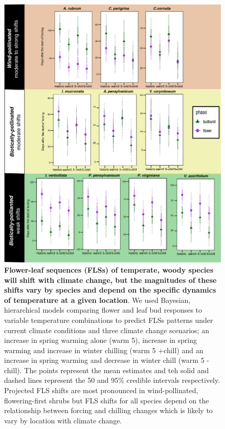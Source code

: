 \documentclass[11pt]{article}
\begin{document}
\pagebreak
\begin{figure}[h!]
    \centering
 \includegraphics[width=\textwidth]{..//Plots/Flobuds_manuscript_figs/climpredictions.jpg}
    \caption{\textbf{Flower-leaf sequences (FLSs) of temperate, woody species will shift with climate change, but the magnitudes of these shifts vary by species and depend on the specific dynamics of temperature at a given location}. We used Bayesian, hierarchical models comparing flower and leaf bud responses to variable temperature combinations to predict FLSs patterns under current climate conditions and three climate change scenarios;  an increase in spring warming alone (warm 5), increase in spring warming and increase in winter chilling (warm 5 +chill) and an increase in spring warming and decrease in winter chill (warm 5 -chill). The points represent the mean estimates and teh solid and dashed lines represent the 50 and 95\% credible intervals respectively. Projected FLS shifts are most pronounced in wind-pollinated, flowering-first shrubs but FLS shifts for all species depend on the relationship between forcing and chilling changes which is likely to vary by location with climate change.}
    \label{fig:preddy}
\end{figure}
\end{document}
